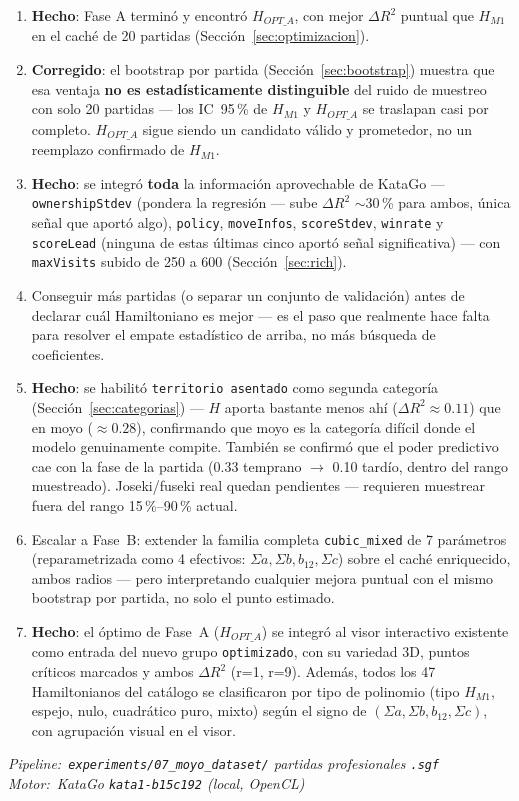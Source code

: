 \documentclass[11pt, a4paper]{article}
\newcommand{\good}[1]{\color{cGood}\textbf{#1}}
\newcommand{\bad}[1]{\color{cBad}\textbf{#1}}
\begin{document}
\begin{enumerate}
  \item \good{Hecho}: Fase A termin\'o y encontr\'o $H_{OPT\_A}$, con
        mejor $\Delta R^2$ puntual que $H_{M1}$ en el cach\'e de 20
        partidas (Secci\'on~\ref{sec:optimizacion}).
  \item \bad{Corregido}: el bootstrap por partida
        (Secci\'on~\ref{sec:bootstrap}) muestra que esa ventaja
        \textbf{no es estad\'isticamente distinguible} del ruido de
        muestreo con solo 20 partidas --- los IC~95\,\% de $H_{M1}$ y
        $H_{OPT\_A}$ se traslapan casi por completo. $H_{OPT\_A}$ sigue
        siendo un candidato v\'alido y prometedor, no un reemplazo
        confirmado de $H_{M1}$.
  \item \good{Hecho}: se integr\'o \textbf{toda} la informaci\'on
        aprovechable de KataGo --- \texttt{ownershipStdev} (pondera la
        regresi\'on --- sube $\Delta R^2$ $\sim$30\,\% para ambos,
        \'unica se\~nal que aport\'o algo), \texttt{policy},
        \texttt{moveInfos}, \texttt{scoreStdev}, \texttt{winrate} y
        \texttt{scoreLead} (ninguna de estas \'ultimas cinco aport\'o
        se\~nal significativa) --- con \texttt{maxVisits} subido de
        250 a 600 (Secci\'on~\ref{sec:rich}).
  \item Conseguir m\'as partidas (o separar un conjunto de validaci\'on)
        antes de declarar cu\'al Hamiltoniano es mejor --- es el paso
        que realmente hace falta para resolver el empate estad\'istico
        de arriba, no m\'as b\'usqueda de coeficientes.
  \item \good{Hecho}: se habilit\'o \texttt{territorio asentado} como
        segunda categor\'ia (Secci\'on~\ref{sec:categorias}) --- $H$
        aporta bastante menos ah\'i ($\Delta R^2\approx0.11$) que en
        moyo ($\approx0.28$), confirmando que moyo es la categor\'ia
        dif\'icil donde el modelo genuinamente compite. Tambi\'en se
        confirm\'o que el poder predictivo cae con la fase de la
        partida (0.33 temprano $\to$ 0.10 tard\'io, dentro del rango
        muestreado). Joseki/fuseki real quedan pendientes --- requieren
        muestrear fuera del rango 15\,\%--90\,\% actual.
  \item Escalar a Fase~B: extender la familia completa
        \texttt{cubic\_mixed} de 7 par\'ametros (reparametrizada como
        4 efectivos: $\Sigma a,\Sigma b,b_{12},\Sigma c$) sobre el
        cach\'e enriquecido, ambos radios --- pero interpretando
        cualquier mejora puntual con el mismo bootstrap por partida,
        no solo el punto estimado.
  \item \good{Hecho}: el \'optimo de Fase~A ($H_{OPT\_A}$) se integr\'o
        al visor interactivo existente como entrada del nuevo grupo
        \texttt{optimizado}, con su variedad 3D, puntos cr\'iticos
        marcados y ambos $\Delta R^2$ (r=1, r=9). Adem\'as, todos los
        47 Hamiltonianos del cat\'alogo se clasificaron por tipo de
        polinomio (tipo $H_{M1}$, espejo, nulo, cuadr\'atico puro,
        mixto) seg\'un el signo de $(\Sigma a,\Sigma b,b_{12},\Sigma c)$,
        con agrupaci\'on visual en el visor.
\end{enumerate}

\vfill
{}\vspace{4pt}
{\color{cMuted}\small\itshape
  Pipeline:~\texttt{experiments/07\_moyo\_dataset/}
  \quad\textbullet{} partidas profesionales \texttt{.sgf}
  \quad\textbullet\quad
  Motor:~KataGo \texttt{kata1-b15c192} (local, OpenCL)
}
\end{document}
